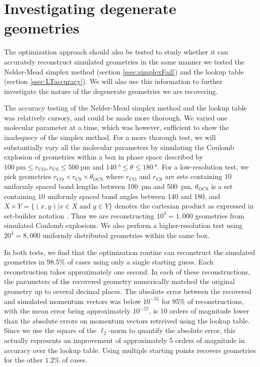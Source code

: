\section{Investigating degenerate geometries} \label{sec:optimizationDegeneracies}
The optimization approach should also be tested to study whether it can accurately reconstruct simulated geometries in the same manner we tested the Nelder-Mead simplex method (section \ref{ssec:simplexFail}) and the lookup table (section \ref{ssec:LTaccuracy}). We will also use this information to further investigate the nature of the degenerate geometries we are recovering.

The accuracy testing of the Nelder-Mead simplex method and the lookup table was relatively cursory, and could be made more thorough. We varied one molecular parameter at a time, which was however, sufficient to show the inadequecy of the simplex method. For a more thorough test, we will substantially vary all the molecular parameters by simulating the Coulomb explosion of geometries within a box in phase space described by $\SI{100}{\pico\meter} \le r_\mathrm{CO}, r_\mathrm{CS} \le \SI{500}{\pico\meter}$ and $\SI{140}{\degree} \le \theta \le \SI{180}{\degree}$. For a low-resolution test, we pick geometries $r_\mathrm{CO} \times r_\mathrm{CS} \times \theta_\mathrm{OCS}$ where $r_\mathrm{CO}$ and $r_\mathrm{CS}$ are sets containing $10$ uniformly spaced bond lengths between \SI{100}{\pico\meter} and \SI{500}{\pico\meter}, $\theta_\mathrm{OCS}$ is a set containing $10$ uniformly spaced bond angles between \SI{140}{\deg} and \SI{180}{\deg}, and $X \times Y = \lbrace (x,y) | x \in X \;\mathrm{and}\; y \in Y \rbrace$ denotes the cartesian product as expressed in set-builder notation \citep[p. 6]{Warner90}. Thus we are reconstructing $10^3 = 1,000$ geometries from simulated Coulomb explosions. We also perform a higher-resolution test using $20^3 = 8,000$ uniformly distributed geometries within the same box.

In both tests, we find that the optimization routine can reconstruct the simulated geometries in $98.5\%$ of cases using only a single starting guess. Each reconstruction takes approximately one second. In each of these reconstructions, the parameters of the recovered geometry numerically matched the original geometry up to several decimal places. The absolute error between the recovered and simulated momentum vectors was below $10^{-55}$ for $95\%$ of reconstructions, with the mean error being approximately $10^{-57}$, is 10 orders of magnitude lower than the absolute errors on momentum vectors retreived using the lookup table. Since we use the square of the $\ell_2$-norm to quantify the absolute error, this actually represents an improvement of approximately 5 orders of magnitude in accuracy over the lookup table. Using multiple starting points recovers geometries for the other $1.2\%$ of cases.

